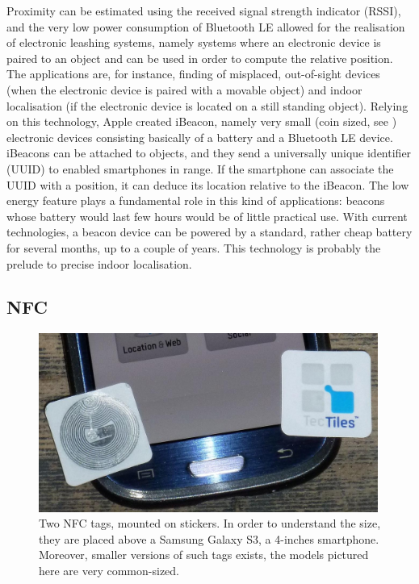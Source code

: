 \documentclass[12pt,a4paper,twoside,openright]{book}
\begin{document}
Proximity can be estimated using the received signal strength indicator (RSSI), and the very low power consumption of Bluetooth LE allowed for the realisation of electronic leashing systems, namely systems where an electronic device is paired to an object and can be used in order to compute the relative position.
%
The applications are, for instance, finding of misplaced, out-of-sight devices (when the electronic device is paired with a movable object) and indoor localisation (if the electronic device is located on a still standing object).
%
Relying on this technology, Apple created iBeacon, namely very small (coin sized, see ) electronic devices consisting basically of a battery and a Bluetooth LE device.
%
iBeacons can be attached to objects, and they send a universally unique identifier (UUID) to enabled smartphones in range.
%
If the smartphone can associate the UUID with a position, it can deduce its location relative to the iBeacon.
%
The low energy feature plays a fundamental role in this kind of applications: beacons whose battery would last few hours would be of little practical use.
%
With current technologies, a beacon device can be powered by a standard, rather cheap battery for several months, up to a couple of years.
%
This technology is probably the prelude to precise indoor localisation. 

\subsection{NFC}

\begin{figure}
	\centering
	\includegraphics[width=0.99\textwidth]{img/nfc-tag}
	\caption{
		Two NFC tags, mounted on stickers.
		In order to understand the size, they are placed above a Samsung Galaxy S3, a 4-inches smartphone.
		Moreover, smaller versions of such tags exists, the models pictured here are very common-sized.
	}
	\label{img:nfc-tag}
\end{figure}
\end{document}
